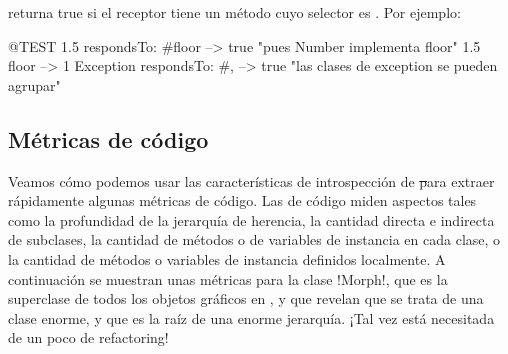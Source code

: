 \documentclass[a4paper,10pt,twoside]{book}
\begin{document}
 returna true si el receptor tiene un
m\'etodo cuyo selector es .
Por ejemplo:
\begin{code}{@TEST}
1.5 respondsTo: #floor      --> true    "pues Number implementa floor"
1.5 floor                            --> 1
Exception respondsTo: #, --> true    "las clases de exception se pueden agrupar"
\end{code}



\subsection{M\'etricas de c\'odigo}

Veamos c\'omo podemos usar las caracter\'isticas de introspecci\'on de \st
para extraer r\'apidamente algunas m\'etricas de c\'odigo.  Las
 de c\'odigo miden aspectos tales como la profundidad de
la jerarqu\'ia de herencia, la cantidad directa e indirecta de
subclases, la cantidad de m\'etodos o de variables de instancia en cada
clase, o la cantidad de m\'etodos o variables de instancia definidos
localmente.  A continuaci\'on se muestran unas m\'etricas para la clase
\ct!Morph!, que es la superclase de todos los objetos gr\'aficos en
\pharo, y que revelan que se trata de una clase enorme, y que es la
ra\'iz de una enorme jerarqu\'ia. ¡Tal vez est\'a necesitada de un poco de
refactoring!
\end{document}
